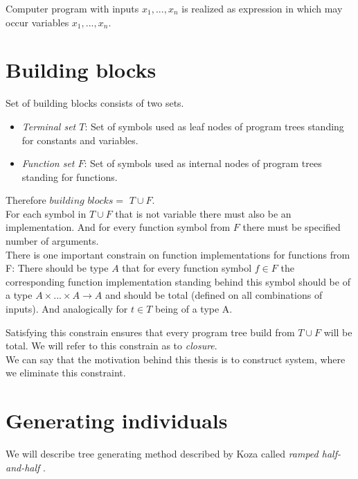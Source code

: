 \documentclass[12pt,a4paper]{report}
\begin{document}
Computer program with inputs $x_{1}, ..., x_{n}$ is realized as expression in which 
may occur variables $x_{1}, ..., x_{n}$.

\section{Building blocks}
\label{building-blocks}

Set of building blocks consists of two sets.

\begin{itemize}
	\item \textit{Terminal set $T$}: Set of symbols used as leaf nodes of 	               
	      program trees standing for constants and variables.
	\item \textit{Function set $F$}: Set of symbols used as internal nodes 
	      of program trees standing for functions.
\end{itemize}

\newcommand{\TuF}{$T \cup F$\xspace}

Therefore $building$ $blocks = $ \TuF.\\

For each symbol in \TuF that is not variable 
there must also be an implementation.
And for every function symbol from $F$ there must be specified 
number of arguments.\\

There is one important constrain on function implementations for functions from F:
There should be type $A$ that for every function symbol $f \in F$ the corresponding function implementation standing behind this symbol should be of a type 
$A \times ... \times A \rightarrow A$ and should be total (defined on all
combinations of inputs). And analogically for $t \in T$ being of a type A.  

Satisfying this constrain ensures that every program tree build 
from \TuF will be total. We will refer to this constrain as to \textit{closure}.\\

We can say that the motivation behind this thesis is to construct system,
where we eliminate this constraint. 

\section{Generating individuals}
\label{GPgene}

We will describe tree generating method described by Koza 
called \textit{ramped half-and-half}  \cite{koza92}. \\
\end{document}
